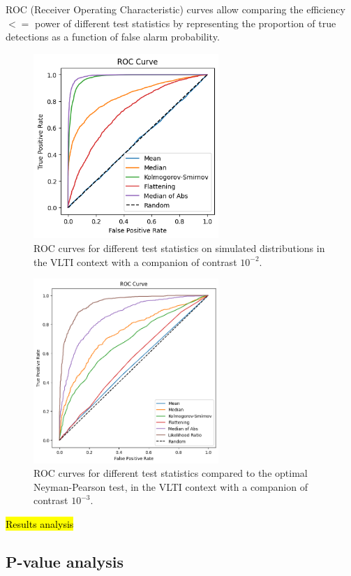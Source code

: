 \documentclass{article}
\newcommand{\dm}[1]{{\color{mulberry} #1}}
\begin{document}
ROC (Receiver Operating Characteristic) curves allow comparing the efficiency \dm{$<=$ power } of different test statistics by representing the proportion of true detections as a function of false alarm probability.

\begin{figure}[H]
\centering
\includegraphics[width=7cm]{img/roc_curves.png}
\caption{ROC curves for different test statistics on simulated distributions in the VLTI context with a companion of contrast $10^{-2}$.}
\label{fig:roc}
\end{figure}

\begin{figure}[H]
\centering
\includegraphics[width=7cm]{img/neyman_pearson.png}
\caption{ROC curves for different test statistics compared to the optimal Neyman-Pearson test, in the VLTI context with a companion of contrast $10^{-3}$.}
\label{fig:neyman-pearson}
\end{figure}

\hl{Results analysis}

\subsection{P-value analysis}
\end{document}
